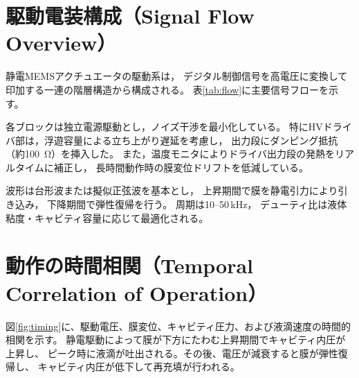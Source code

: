 \documentclass[conference]{IEEEtran}
\begin{document}
\section{駆動電装構成（Signal Flow Overview）}
静電MEMSアクチュエータの駆動系は，
デジタル制御信号を高電圧に変換して印加する一連の階層構造から構成される。
表\ref{tab:flow}に主要信号フローを示す。

\begin{table}[t]
\centering
\caption{静電MEMSアクチュエータ駆動信号フロー}
\label{tab:flow}
\end{table}

各ブロックは独立電源駆動とし，ノイズ干渉を最小化している。
特にHVドライバ部は，浮遊容量による立ち上がり遅延を考慮し，
出力段にダンピング抵抗（約\SI{100}{\ohm}）を挿入した。
また，温度モニタによりドライバ出力段の発熱をリアルタイムに補正し，
長時間動作時の膜変位ドリフトを低減している。

波形は台形波または擬似正弦波を基本とし，
上昇期間で膜を静電引力により引き込み，
下降期間で弾性復帰を行う。
周期は10--50\,kHz，
デューティ比は液体粘度・キャビティ容量に応じて最適化される。

\section{動作の時間相関（Temporal Correlation of Operation）}
図\ref{fig:timing}に、駆動電圧、膜変位、キャビティ圧力、および液滴速度の時間的相関を示す。
静電駆動によって膜が下方にたわむ上昇期間でキャビティ内圧が上昇し、
ピーク時に液滴が吐出される。その後、電圧が減衰すると膜が弾性復帰し、
キャビティ内圧が低下して再充填が行われる。
\end{document}

